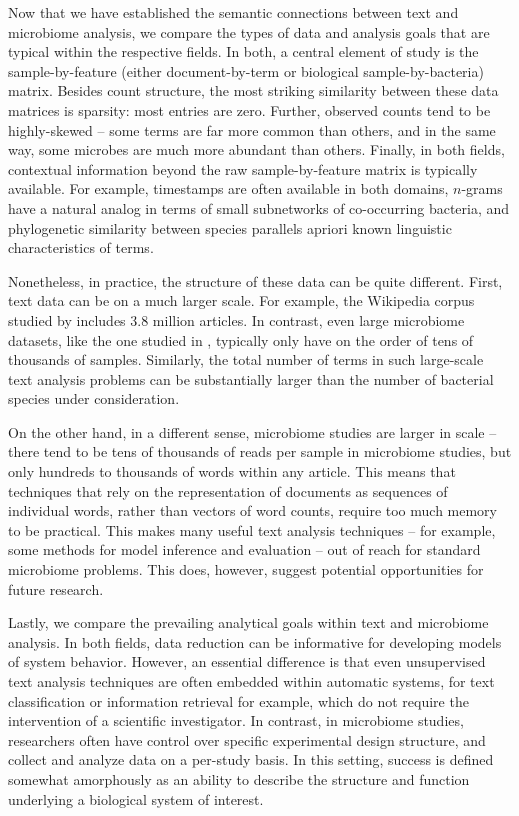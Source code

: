 \documentclass[oupdraft]{bio}
\begin{document}
Now that we have established the semantic connections between text and
microbiome analysis, we compare the types of data and analysis goals that are
typical within the respective fields. In both, a central element of study is
the sample-by-feature (either document-by-term or biological sample-by-bacteria)
matrix. Besides count structure, the most striking similarity between these data
matrices is sparsity: most entries are zero. Further, observed counts tend to be
highly-skewed -- some terms are far more common than others, and in the same
way, some microbes are much more abundant than others. Finally, in both fields,
contextual information beyond the raw sample-by-feature matrix is typically
available. For example, timestamps are often available in both domains,
$n$-grams have a natural analog in terms of small subnetworks of co-occurring
bacteria, and phylogenetic similarity between species parallels apriori known
linguistic characteristics of terms.

Nonetheless, in practice, the structure of these data can be quite different.
First, text data can be on a much larger scale. For example, the Wikipedia
corpus studied by \cite{hoffman2013stochastic} includes 3.8 million articles. In
contrast, even large microbiome datasets, like the one studied in
\citep{gilbert2014earth}, typically only have on the order of tens of thousands
of samples. Similarly, the total number of terms in such large-scale text
analysis problems can be substantially larger than the number of bacterial
species under consideration.

On the other hand, in a different sense, microbiome studies are larger in scale
-- there tend to be tens of thousands of reads per sample in microbiome studies,
but only hundreds to thousands of words within any article. This means that
techniques that rely on the representation of documents as sequences of
individual words, rather than vectors of word counts, require too much memory to
be practical. This makes many useful text analysis techniques -- for example,
some methods for model inference and evaluation \citep{wallach2009evaluation} --
out of reach for standard microbiome problems. This does, however, suggest
potential opportunities for future research.

Lastly, we compare the prevailing analytical goals within text and microbiome
analysis. In both fields, data reduction can be informative for developing
models of system behavior. However, an essential difference is that even
unsupervised text analysis techniques are often embedded within automatic
systems, for text classification or information retrieval for example, which do
not require the intervention of a scientific investigator. In contrast, in
microbiome studies, researchers often have control over specific experimental
design structure, and collect and analyze data on a per-study basis. In this
setting, success is defined somewhat amorphously as an ability to describe the
structure and function underlying a biological system of interest.
\end{document}
